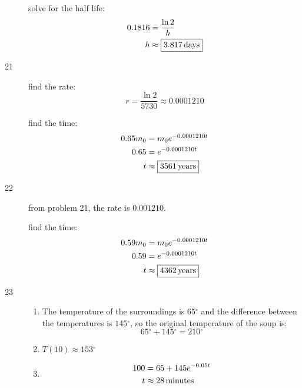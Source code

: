 \documentclass{exam}
\newcommand{\degree}{\ensuremath{^\circ}}
\begin{document}
\begin{description}
        solve for the half life:
        \begin{align*}
          0.1816 & = \frac{\ln 2}{h} \\
          h      & \approx \boxed{\unit[3.817]{days}} \\
        \end{align*}

      \item[21]
        find the rate: 
        \[
          r = \frac{\ln 2}{5730} \approx 0.0001210
        \]

        find the time:
        \begin{align*}
          0.65 m_0 & = m_0 e^{-0.0001210 t} \\
          0.65     & =  e^{-0.0001210 t} \\
          t        & \approx \boxed{\unit[3561]{years}} \\
        \end{align*}

      \item[22]
        from problem 21, the rate is $0.001210$.

        find the time:
        \begin{align*}
          0.59 m_0 & = m_0 e^{-0.0001210 t} \\
          0.59     & =  e^{-0.0001210 t} \\
          t        & \approx \boxed{\unit[4362]{years}} \\
        \end{align*}

      \item[23]
        \begin{enumerate}[a]
          \item The temperature of the surroundings is $65 \degree$ and the difference between the temperatures is
            $145 \degree$, so the original temperature of the soup is:
            \[
              65 \degree + 145 \degree = \boxed{210 \degree}
            \]

          \item $T(10) \approx \boxed{153 \degree}$

          \item 
            \begin{align*}
              100 & = 65 + 145 e^{-0.05t} \\
              t   & \approx \unit[28]{minutes} \\
            \end{align*}
        \end{enumerate}


\end{description}
\end{document}

